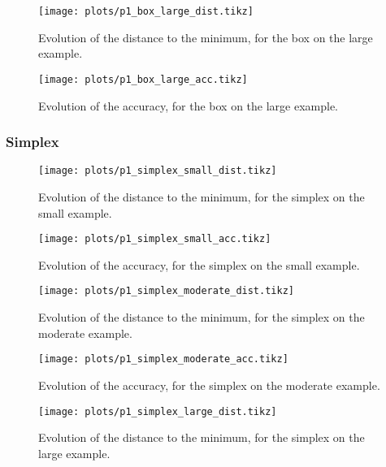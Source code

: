 \documentclass[final]{aomart}
\newtheorem[{}\it]{thm}{Theorem}[section]
\theoremstyle{definition}
\newtheorem*[{}\it]{notation}{Notation}
\numberwithin{equation}{section}
\begin{document}
\begin{figure}[H]
	\centering
	\texttt{[image: plots/p1\_box\_large\_dist.tikz]}
	\caption{Evolution of the distance to the minimum, for the box on the large example.}
	\label{fig:app_box_large_dist}
\end{figure}

\begin{figure}[H]
	\centering
	\texttt{[image: plots/p1\_box\_large\_acc.tikz]}
	\caption{Evolution of the accuracy, for the box on the large example.}
	\label{fig:app_box_large_acc}
\end{figure}

\subsubsection{Simplex}
\begin{figure}[H]
	\centering
	\texttt{[image: plots/p1\_simplex\_small\_dist.tikz]}
	\caption{Evolution of the distance to the minimum, for the simplex on the small example.}
	\label{fig:app_simplex_small_dist}
\end{figure}

\begin{figure}[H]
	\centering
	\texttt{[image: plots/p1\_simplex\_small\_acc.tikz]}
	\caption{Evolution of the accuracy, for the simplex on the small example.}
	\label{fig:app_simplex_small_acc}
\end{figure}

\begin{figure}[H]
	\centering
	\texttt{[image: plots/p1\_simplex\_moderate\_dist.tikz]}
	\caption{Evolution of the distance to the minimum, for the simplex on the moderate example.}
	\label{fig:app_simplex_moderate_dist}
\end{figure}

\begin{figure}[H]
	\centering
	\texttt{[image: plots/p1\_simplex\_moderate\_acc.tikz]}
	\caption{Evolution of the accuracy, for the simplex on the moderate example.}
	\label{fig:app_simplex_moderate_acc}
\end{figure}

\begin{figure}[H]
	\centering
	\texttt{[image: plots/p1\_simplex\_large\_dist.tikz]}
	\caption{Evolution of the distance to the minimum, for the simplex on the large example.}
	\label{fig:app_simplex_large_dist}
\end{figure}
\end{document}

